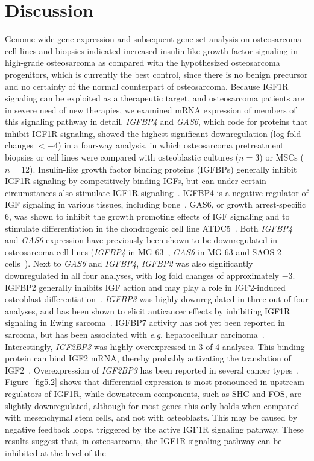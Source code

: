 \section{Discussion}\label{discussion5}
Genome\hyp{}wide gene expression and subsequent gene set analysis on osteosarcoma cell lines and biopsies indicated increased insulin\hyp{}like growth factor signaling in high\hyp{}grade osteosarcoma as compared with the hypothesized osteosarcoma progenitors, which is currently the best control, since there is no benign precursor and no certainty of the normal counterpart of osteosarcoma. Because IGF1R signaling can be exploited as a therapeutic target, and osteosarcoma patients are in severe need of new therapies, we examined mRNA expression of members of this signaling pathway in detail. {\it IGFBP4} and {\it GAS6}, which code for proteins that inhibit IGF1R signaling, showed the highest significant downregulation (log fold changes $<-4$) in a four\hyp{}way analysis, in which osteosarcoma pretreatment biopsies or cell lines were compared with osteoblastic cultures ($n=3$) or MSCs ($n=12$). Insulin\hyp{}like growth factor binding proteins (IGFBPs) generally inhibit IGF1R signaling by competitively binding IGFs, but can under certain circumstances also stimulate IGF1R signaling~\cite{grimberg2000role}. IGFBP4 is a negative regulator of IGF signaling in various tissues, including bone~\cite{conover2008insulin}. GAS6, or growth arrest\hyp{}specific 6, was shown to inhibit the growth promoting effects of IGF signaling and to stimulate differentiation in the chondrogenic cell line ATDC5~\cite{hutchison2010scf}. Both {\it IGFBP4} and {\it GAS6} expression have previously been shown to be downregulated in osteosarcoma cell lines ({\it IGFBP4} in MG-63~\cite{scharla19931}, {\it GAS6} in MG-63 and SAOS-2 cells~\cite{shiozawa2010gas6}). Next to {\it GAS6} and {\it IGFBP4}, {\it IGFBP2} was also significantly downregulated in all four analyses, with log fold changes of approximately $-3$. IGFBP2 generally inhibits IGF action and may play a role in IGF2\hyp{}induced osteoblast differentiation~\cite{conover2008insulin}. {\it IGFBP3} was highly downregulated in three out of four analyses, and has been shown to elicit anticancer effects by inhibiting IGF1R signaling in Ewing sarcoma~\cite{benini2006insulin}. IGFBP7 activity has not yet been reported in sarcoma, but has been associated with {\it e.g.} hepatocellular carcinoma~\cite{chen2011insulin}. Interestingly, {\it IGF2BP3} was highly overexpressed in 3 of 4 analyses. This binding protein can bind IGF2 mRNA, thereby probably activating the translation of IGF2~\cite{liao2005rna}. Overexpression of {\it IGF2BP3} has been reported in several cancer types~\cite{schaeffer2010insulin,suvasini2011insulin}. Figure~\ref{fig5.2} shows that differential expression is most pronounced in upstream regulators of IGF1R, while downstream components, such as SHC and FOS, are slightly downregulated, although for most genes this only holds when compared with mesenchymal stem cells, and not with osteoblasts. This may be caused by negative feedback loops, triggered by the active IGF1R signaling pathway. These results suggest that, in osteosarcoma, the IGF1R signaling pathway can be inhibited at the level of the 